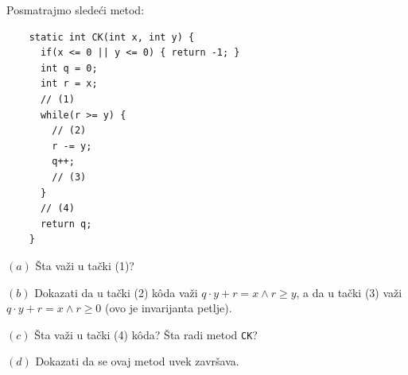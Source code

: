 \begin{EX}
  Posmatrajmo slede\'ci metod:
{\small
\begin{verbatim}
    static int CK(int x, int y) {
      if(x <= 0 || y <= 0) { return -1; }
      int q = 0;
      int r = x;
      // (1)
      while(r >= y) {
        // (2)
        r -= y;
        q++;
        // (3)
      }
      // (4)
      return q;
    }
\end{verbatim}
}

\medskip

\noindent
$(a)$ \v Sta va\v zi u ta\v cki (1)?

\medskip

\noindent
$(b)$ Dokazati da u ta\v cki (2) k\^oda va\v zi $q \cdot y + r = x \land r \ge y$,
a da u ta\v cki (3) va\v zi $q \cdot y + r = x \land r \ge 0$ (ovo je invarijanta petlje).

\medskip

\noindent
$(c)$ \v Sta va\v zi u ta\v cki (4) k\^oda? \v Sta radi metod \verb"CK"?

\medskip

\noindent
$(d)$ Dokazati da se ovaj metod uvek zavr\v sava.
\end{EX}
